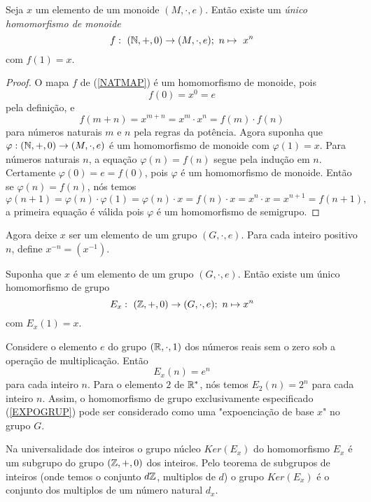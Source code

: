 \begin{theorem}
  Seja $x$ um elemento de um monoide $(M, \cdot, e)$. Então existe um \emph{único homomorfismo de monoide}
  \begin{equation}\label{NATMAP}
    f:\ (\mathbb{N}, +, 0) \to (M,\cdot, e);\ n \mapsto\ x^{n}
  \end{equation}
  com $f(1) = x.$
  \begin{proof}
    O mapa $f$ de (\ref{NATMAP}) é um homomorfismo de monoide, pois $$f(0) = x^{0} = e$$ pela definição, e $$f(m+n) = x^{m+n} = x^{m} \cdot x^{n} = f(m) \cdot f(n)$$ para números naturais $m$ e $n$ pela regras da potência.
    Agora suponha que $\varphi: (\mathbb{N}, +, 0) \to (M, \cdot , e)$ é um homomorfismo de monoide com $\varphi(1) = x$. Para números naturais $n$, a equação $\varphi(n) = f(n)$ segue pela indução em $n$. Certamente $\varphi(0) = e = f(0)$, pois $\varphi$ é um homomorfismo de monoide. Então se $\varphi(n) = f(n)$, nós temos 
    $$\varphi(n + 1) = \varphi(n) \cdot \varphi(1) = \varphi(n) \cdot x = f(n) \cdot x = x^{n} \cdot x = x^{n+1} = f(n + 1),$$
    a primeira equação é válida pois $\varphi$ é um homomorfismo de semigrupo.
  \end{proof}
\end{theorem}
Agora deixe $x$ ser um elemento de um grupo $(G,\cdot , e)$. Para cada inteiro positivo $n$, define $x^{-n} = (x^{-1})$. 
\begin{theorem}
  Suponha que $x$ é um elemento de um grupo $(G,\cdot, e)$. Então existe um único homomorfismo de grupo
  \begin{equation}\label{EXPOGRUP}
    E_{x}:\ (\mathbb{Z}, +, 0) \to (G, \cdot, e);\ n \mapsto x^{n}
  \end{equation}
  com $E_{x}(1) = x.$
\end{theorem}
\begin{exmp}[Exponenciação]
  Considere o elemento $e$ do grupo $(\mathbb{R}, \cdot , 1)$ dos números reais sem o zero sob a operação de multiplicação. Então $$E_{x}(n) = e^{n}$$
  para cada inteiro $n$. Para o elemento $2$ de $\mathbb{R}^{*}$, nós temos $E_{2}(n) = 2^{n}$ para cada inteiro $n$. Assim, o homomorfismo de grupo exclusivamente especificado (\ref{EXPOGRUP}) pode ser considerado como uma "expoenciação de base $x$" no grupo $G$.
\end{exmp}
Na universalidade dos inteiros o grupo núcleo $Ker(E_{x})$ do homomorfismo $E_{x}$ é um subgrupo do grupo $(\mathbb{Z}, +, 0)$ dos inteiros. Pelo teorema de subgrupos de inteiros (onde temos o conjunto $d\mathbb{Z}$, multiplos de $d$) o grupo $Ker(E_{x})$ é o conjunto dos multiplos de um número natural $d_{x}$.
